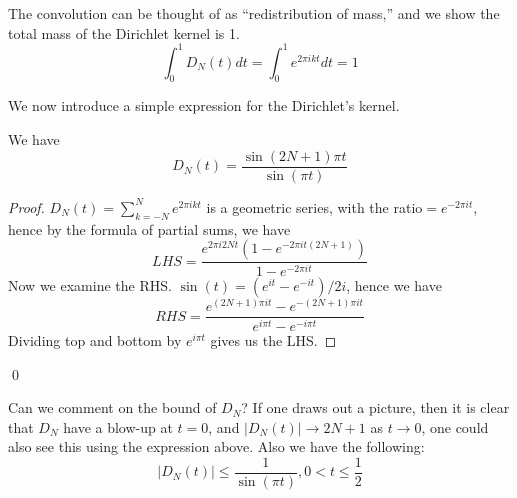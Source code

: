 The convolution can be thought of as ``redistribution of mass,'' and we show the total mass of the Dirichlet kernel is 1.
\begin{equation*}
    \int_0^1D_N(t)dt=\int_0^1e^{2\pi ikt}dt=1
\end{equation*}

We now introduce a simple expression for the Dirichlet's kernel.
\begin{proposition}
    We have
    \begin{equation*}
        D_N(t)=\frac{\sin(2N+1)\pi t}{\sin(\pi t)}
    \end{equation*}
\end{proposition}
\begin{proof}
    $D_N(t)=\sum_{k=-N}^Ne^{2\pi ikt}$ is a geometric series, with the ratio$=e^{-2\pi it}$, hence by the formula of partial sums, we have
    \begin{equation*}
        LHS=\frac{e^{2\pi i2Nt}(1-e^{-2\pi it(2N+1)})}{1-e^{-2\pi it}}
    \end{equation*}
    Now we examine the RHS. $\sin(t)=(e^{it}-e^{-it})/2i$, hence we have
    \begin{equation*}
        RHS=\frac{e^{(2N+1)\pi it}-e^{-(2N+1)\pi it}}{e^{i\pi t}-e^{-i\pi t}}
    \end{equation*}
    Dividing top and bottom by $e^{i\pi t}$ gives us the LHS.
\end{proof}
\qed

Can we comment on the bound of $D_N$? If one draws out a picture, then it is clear that $D_N$ have a blow-up at $t=0$, and $|D_N(t)|\to 2N+1$ as $t\to 0$, one could also see this using the expression above. Also we have the following:
\begin{equation*}
    |D_N(t)|\leq\frac{1}{\sin(\pi t)}, 0<t\leq\frac{1}{2}
\end{equation*}

